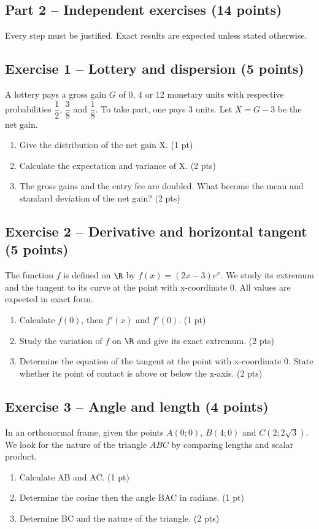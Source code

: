 \clearpage\subsection*{Part 2 -- Independent exercises (14 points)}
Every step must be justified. Exact results are expected unless stated otherwise.
\subsection*{Exercise 1 -- Lottery and dispersion (5 points)}
A lottery pays a gross gain $G$ of 0, 4 or 12 monetary units with respective probabilities $\dfrac12$, $\dfrac38$ and $\dfrac18$. To take part, one pays 3 units. Let $X=G-3$ be the net gain.
\begin{enumerate}
\item Give the distribution of the net gain X. \hfill(1 pt)
\item Calculate the expectation and variance of X. \hfill(2 pts)
\item The gross gains and the entry fee are doubled. What become the mean and standard deviation of the net gain? \hfill(2 pts)
\end{enumerate}
\subsection*{Exercise 2 -- Derivative and horizontal tangent (5 points)}
The function $f$ is defined on $\R$ by $f(x)=(2x-3)e^x$. We study its extremum and the tangent to its curve at the point with x-coordinate 0. All values are expected in exact form.
\begin{enumerate}
\item Calculate $f(0)$, then $f\prime(x)$ and $f\prime(0)$. \hfill(1 pt)
\item Study the variation of $f$ on $\R$ and give its exact extremum. \hfill(2 pts)
\item Determine the equation of the tangent at the point with x-coordinate 0. State whether its point of contact is above or below the x-axis. \hfill(2 pts)
\end{enumerate}
\subsection*{Exercise 3 -- Angle and length (4 points)}
In an orthonormal frame, given the points $A(0;0)$, $B(4;0)$ and $C(2;2\sqrt3)$. We look for the nature of the triangle $ABC$ by comparing lengths and scalar product.
\begin{enumerate}
\item Calculate AB and AC. \hfill(1 pt)
\item Determine the cosine then the angle BAC in radians. \hfill(1 pt)
\item Determine BC and the nature of the triangle. \hfill(2 pts)
\end{enumerate}
